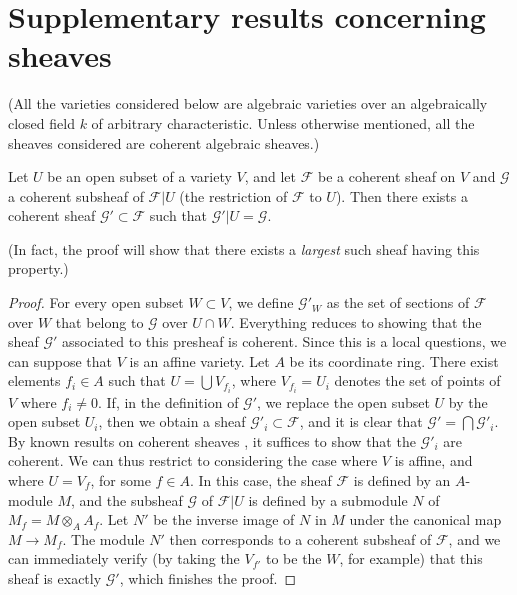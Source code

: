 \documentclass{article}
\theoremstyle{plain}
\newenvironment{proposition}[1]
    {\renewcommand\theinnercustomproposition{#1}\innercustomproposition}
    {\endinnercustomproposition}
\theoremstyle{definition}
\newcommand{\sh}{\mathscr}
\newcommand{\oldpage}[1]{\marginpar{\footnotesize$\Big\vert$ \textit{p.~#1}}}
\begin{document}
\section{Supplementary results concerning sheaves}
\label{section1}

(All the varieties considered below are algebraic varieties over an algebraically closed field $k$ of arbitrary characteristic. Unless otherwise mentioned, all the sheaves considered are coherent algebraic sheaves.)

\begin{proposition}{1}
\label{proposition1}
\oldpage{98}
  Let $U$ be an open subset of a variety $V$, and let $\sh{F}$ be a coherent sheaf on $V$ and $\sh{G}$ a coherent subsheaf of $\sh{F}|U$ (the restriction of $\sh{F}$ to $U$).
  Then there exists a coherent sheaf $\sh{G}'\subset\sh{F}$ such that $\sh{G}'|U=\sh{G}$.
\end{proposition}

(In fact, the proof will show that there exists a \emph{largest} such sheaf having this property.)

\begin{proof}
  For every open subset $W\subset V$, we define $\sh{G}'_W$ as the set of sections of $\sh{F}$ over $W$ that belong to $\sh{G}$ over $U\cap W$.
  Everything reduces to showing that the sheaf $\sh{G}'$ associated to this presheaf is coherent.
  Since this is a local questions, we can suppose that $V$ is an affine variety.
  Let $A$ be its coordinate ring.
  There exist elements $f_i\in A$ such that $U=\bigcup V_{f_i}$, where $V_{f_i}=U_i$ denotes the set of points of $V$ where $f_i\neq0$.
  If, in the definition of $\sh{G}'$, we replace the open subset $U$ by the open subset $U_i$, then we obtain a sheaf $\sh{G}'_i\subset\sh{F}$, and it is clear that $\sh{G}'=\bigcap\sh{G}'_i$.
  By known results on coherent sheaves \cite[p.~209]{12}, it suffices to show that the $\sh{G}'_i$ are coherent.
  We can thus restrict to considering the case where $V$ is affine, and where $U=V_f$, for some $f\in A$.
  In this case, the sheaf $\sh{F}$ is defined by an $A$-module $M$, and the subsheaf $\sh{G}$ of $\sh{F}|U$ is defined by a submodule $N$ of $M_f=M\otimes_A A_f$.
  Let $N'$ be the inverse image of $N$ in $M$ under the canonical map $M\to M_f$.
  The module $N'$ then corresponds to a coherent subsheaf of $\sh{F}$, and we can immediately verify (by taking the $V_{f'}$ to be the $W$, for example) that this sheaf is exactly $\sh{G}'$, which finishes the proof.
\end{proof}
\end{document}
